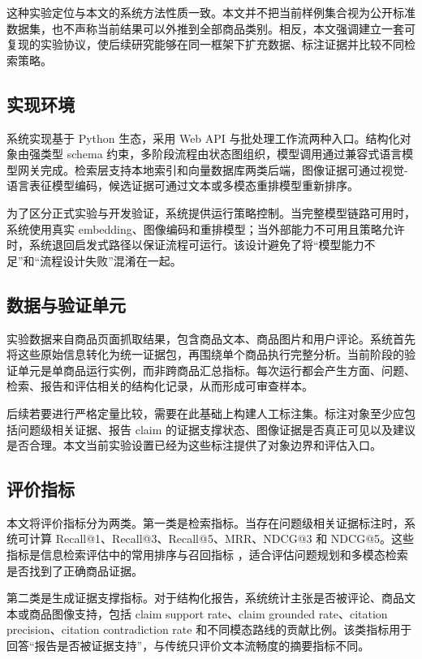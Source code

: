 \documentclass[11pt]{article}
\begin{document}
这种实验定位与本文的系统方法性质一致。本文并不把当前样例集合视为公开标准数据集，也不声称当前结果可以外推到全部商品类别。相反，本文强调建立一套可复现的实验协议，使后续研究能够在同一框架下扩充数据、标注证据并比较不同检索策略。

\subsection{实现环境}

系统实现基于 Python 生态，采用 Web API 与批处理工作流两种入口。结构化对象由强类型 schema 约束，多阶段流程由状态图组织，模型调用通过兼容式语言模型网关完成。检索层支持本地索引和向量数据库两类后端，图像证据可通过视觉-语言表征模型编码，候选证据可通过文本或多模态重排模型重新排序。

为了区分正式实验与开发验证，系统提供运行策略控制。当完整模型链路可用时，系统使用真实 embedding、图像编码和重排模型；当外部能力不可用且策略允许时，系统退回启发式路径以保证流程可运行。该设计避免了将``模型能力不足''和``流程设计失败''混淆在一起。

\subsection{数据与验证单元}

实验数据来自商品页面抓取结果，包含商品文本、商品图片和用户评论。系统首先将这些原始信息转化为统一证据包，再围绕单个商品执行完整分析。当前阶段的验证单元是单商品运行实例，而非跨商品汇总指标。每次运行都会产生方面、问题、检索、报告和评估相关的结构化记录，从而形成可审查样本。

后续若要进行严格定量比较，需要在此基础上构建人工标注集。标注对象至少应包括问题级相关证据、报告 claim 的证据支撑状态、图像证据是否真正可见以及建议是否合理。本文当前实验设置已经为这些标注提供了对象边界和评估入口。

\subsection{评价指标}

本文将评价指标分为两类。第一类是检索指标。当存在问题级相关证据标注时，系统可计算 Recall@1、Recall@3、Recall@5、MRR、NDCG@3 和 NDCG@5。这些指标是信息检索评估中的常用排序与召回指标 \citep{manning2008introductionIr}，适合评估问题规划和多模态检索是否找到了正确商品证据。

第二类是生成证据支撑指标。对于结构化报告，系统统计主张是否被评论、商品文本或商品图像支持，包括 claim support rate、claim grounded rate、citation precision、citation contradiction rate 和不同模态路线的贡献比例。该类指标用于回答``报告是否被证据支持''，与传统只评价文本流畅度的摘要指标不同。
\end{document}
